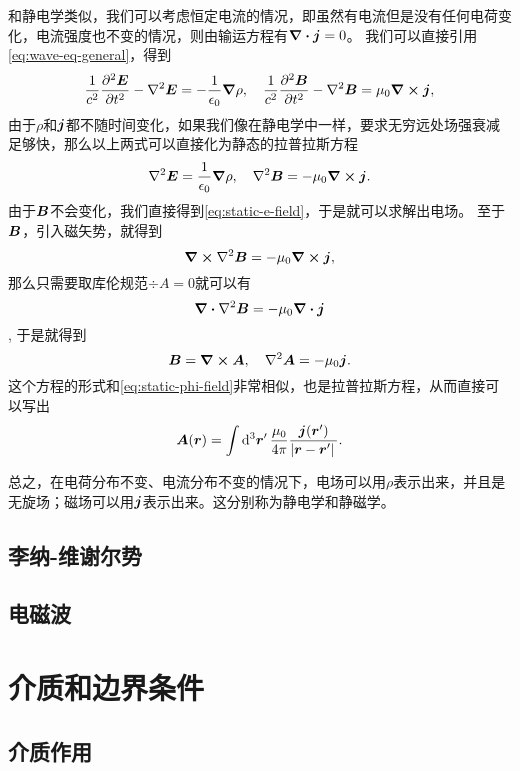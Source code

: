 \documentclass[UTF8, a4paper]{ctexart}
\begin{document}
和静电学类似，我们可以考虑恒定电流的情况，即虽然有电流但是没有任何电荷变化，电流强度也不变的情况，则由输运方程有$\div{\vb*{j}}=0$。
我们可以直接引用\eqref{eq:wave-eq-general}，得到
\[
    \frac{1}{c^2} \pdv[2]{\vb*{E}}{t} - \laplacian{\vb*{E}} = - \frac{1}{\epsilon_0} \grad{\rho} , \quad \frac{1}{c^2} \pdv[2]{\vb*{B}}{t} - \laplacian{\vb*{B}} = \mu_0 \curl{\vb*{j}},
\]
由于$\rho$和$\vb*{j}$都不随时间变化，如果我们像在静电学中一样，要求无穷远处场强衰减足够快，那么以上两式可以直接化为静态的拉普拉斯方程
\[
    \laplacian{\vb*{E}} = \frac{1}{\epsilon_0} \grad{\rho}, \quad \laplacian{\vb*{B}} = - \mu_0 \curl{\vb*{j}}.
\]
由于$\vb*{B}$不会变化，我们直接得到\eqref{eq:static-e-field}，于是就可以求解出电场。
至于$\vb*{B}$，引入磁矢势，就得到
\[
    \curl{\laplacian{\vb*{B}}} = - \mu_0 \curl{\vb*{j}},
\]
那么只需要取库伦规范$\div{A}=0$就可以有
\[
    \div{\laplacian{\vb*{B}}} = - \mu_0 \div{\vb*{j}}
\],
于是就得到
\begin{equation}
    \vb*{B} = \curl{\vb*{A}}, \quad \laplacian{\vb*{A}} = - \mu_0 \vb*{j}.
\end{equation}
这个方程的形式和\eqref{eq:static-phi-field}非常相似，也是拉普拉斯方程，从而直接可以写出
\begin{equation}
    \vb*{A}(\vb*{r}) = \int \dd[3]{\vb*{r}'} \frac{\mu_0}{4\pi} \frac{\vb*{j}(\vb*{r}')}{\abs*{\vb*{r} - \vb*{r}'}}.
    \label{eq:from-j-to-a}
\end{equation}

总之，在电荷分布不变、电流分布不变的情况下，电场可以用$\rho$表示出来，并且是无旋场；磁场可以用$\vb*{j}$表示出来。这分别称为静电学和静磁学。

\subsection{李纳-维谢尔势}

\subsection{电磁波}

\section{介质和边界条件}

\subsection{介质作用}
\end{document}
